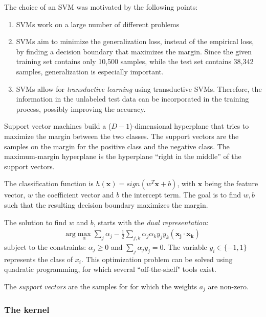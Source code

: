 \documentclass[a4paper]{article}
\begin{document}
The choice of an SVM was motivated by the following points:

\begin{enumerate}
\item SVMs work on a large number of different problems
\item SVMs aim to minimize the generalization loss, instead of the
  empirical loss, by finding a decision boundary that maximizes the
  margin. Since the given training set contains only 10,500 samples,
  while the test set contains 38,342 samples, generalization is
  especially important.
\item SVMs allow for \emph{transductive learning} using transductive
  SVMs. Therefore, the information in the unlabeled test data can be
  incorporated in the training process, possibly improving the
  accuracy.
\end{enumerate}

Support vector machines build a ($D-1$)-dimensional hyperplane that
tries to maximize the margin between the two classes. The support
vectors are the samples on the margin for the positive class and the
negative class. The maximum-margin hyperplane is the hyperplane
``right in the middle'' of the support vectors.

The classification function is
$h(\mathbf{x}) = sign(w^T\mathbf{x} + b)$, with $\mathbf{x}$ being the
feature vector, $w$ the coefficient vector and $b$ the intercept
term. The goal is to find $w, b$ such that the resulting decision
boundary maximizes the margin.

The solution to find $w$ and $b$, starts with the \emph{dual representation}:
\begin{align}
\label{eq:dual}
\text{arg}\max_\alpha\sum_j\alpha_j - \frac{1}{2}\sum_{j,k}\alpha_j\alpha_ky_jy_k(\mathbf{x_j} \cdot \mathbf{x_k})
\end{align} subject to the constraints: $\alpha_j \geq 0$ and $\sum_j\alpha_jy_j=0$. The variable $y_i \in \{-1, 1\}$ represents the class of $x_i$. This optimization problem can be solved using quadratic programming, for which several ``off-the-shelf" tools exist.

The \emph{support vectors} are the samples for for which the weights $a_j$ are non-zero. 

\subsubsection{The kernel}
\label{sec:kernel}
\end{document}
